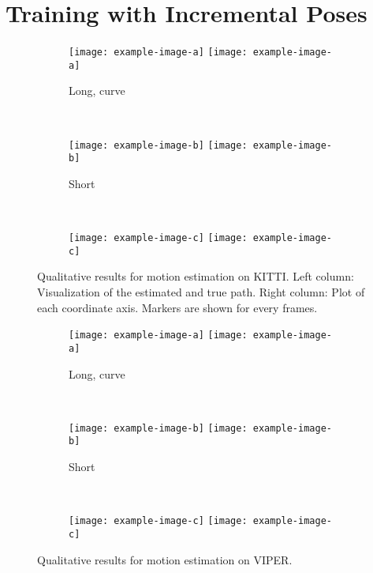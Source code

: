 	\section{Training with Incremental Poses}

		\begin{figure}
			\centering
			\begin{subfigure}[b]{\linewidth}
				\centering
				\texttt{[image: example-image-a]}
				\texttt{[image: example-image-a]}
				\caption{
					Long, curve
					\label{fig:0}
				}
			\end{subfigure}%
			\\
			\begin{subfigure}[b]{\linewidth}
				\centering
				\texttt{[image: example-image-b]}
				\texttt{[image: example-image-b]}
				\caption{
					Short
					\label{fig:0}
				}
			\end{subfigure}%
			\\
			\begin{subfigure}[b]{\linewidth}
				\centering
				\texttt{[image: example-image-c]}
				\texttt{[image: example-image-c]}
				\caption{
					\label{fig:0}
				}
			\end{subfigure}%
			\caption[Qualitative results for motion estimation on KITTI]
					{Qualitative results for motion estimation on KITTI.
				 Left column: Visualization of the estimated and true path.
				 Right column: Plot of each coordinate axis.
				 Markers are shown for every  frames.
					\label{fig:0}}
		\end{figure}


		\begin{figure}
			\centering
			\begin{subfigure}[b]{\linewidth}
				\centering
				\texttt{[image: example-image-a]}
				\texttt{[image: example-image-a]}
				\caption{
					Long, curve
					\label{fig:0}
				}
			\end{subfigure}%
			\\
			\begin{subfigure}[b]{\linewidth}
				\centering
				\texttt{[image: example-image-b]}
				\texttt{[image: example-image-b]}
				\caption{
					Short
					\label{fig:0}
				}
			\end{subfigure}%
			\\
			\begin{subfigure}[b]{\linewidth}
				\centering
				\texttt{[image: example-image-c]}
				\texttt{[image: example-image-c]}
				\caption{
					\label{fig:0}
				}
			\end{subfigure}%
			\caption[Qualitative results for motion estimation on VIPER]
					{Qualitative results for motion estimation on VIPER.
				 \label{fig:0}}
		\end{figure}